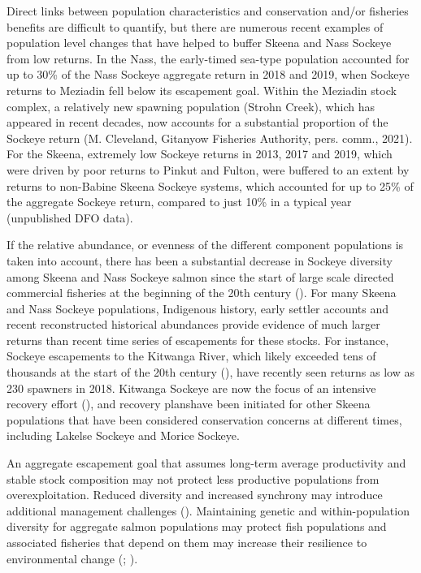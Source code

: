 \documentclass[french,11pt]{book}
\begin{document}
Direct links between population characteristics and conservation and/or fisheries benefits are difficult to quantify, but there are numerous recent examples of population level changes that have helped to buffer Skeena and Nass Sockeye from low returns. In the Nass, the early-timed sea-type population accounted for up to 30\% of the Nass Sockeye aggregate return in 2018 and 2019, when Sockeye returns to Meziadin fell below its escapement goal. Within the Meziadin stock complex, a relatively new spawning population (Strohn Creek), which has appeared in recent decades, now accounts for a substantial proportion of the Sockeye return (M. Cleveland, Gitanyow Fisheries Authority, pers. comm., 2021). For the Skeena, extremely low Sockeye returns in 2013, 2017 and 2019, which were driven by poor returns to Pinkut and Fulton, were buffered to an extent by returns to non-Babine Skeena Sockeye systems, which accounted for up to 25\% of the aggregate Sockeye return, compared to just 10\% in a typical year (unpublished DFO data).

If the relative abundance, or evenness of the different component populations is taken into account, there has been a substantial decrease in Sockeye diversity among Skeena and Nass Sockeye salmon since the start of large scale directed commercial fisheries at the beginning of the 20th century (). For many Skeena and Nass Sockeye populations, Indigenous history, early settler accounts and recent reconstructed historical abundances provide evidence of much larger returns than recent time series of escapements for these stocks. For instance, Sockeye escapements to the Kitwanga River, which likely exceeded tens of thousands at the start of the 20th century (), have recently seen returns as low as 230 spawners in 2018. Kitwanga Sockeye are now the focus of an intensive recovery effort (), and recovery planshave been initiated for other Skeena populations that have been considered conservation concerns at different times, including Lakelse Sockeye and Morice Sockeye.

An aggregate escapement goal that assumes long-term average productivity and stable stock composition may not protect less productive populations from overexploitation. Reduced diversity and increased synchrony may introduce additional management challenges (). Maintaining genetic and within-population diversity for aggregate salmon populations may protect fish populations and associated fisheries that depend on them may increase their resilience to environmental change (; ).
\end{document}
